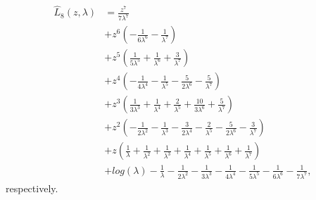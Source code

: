 \begin{displaymath}
\begin{split}
\hat{L}_{8}{\left (z,\lambda \right )} &= \frac{z^{7}}{7 \lambda^{7}} \\
&+ z^{6} \left(- \frac{1}{6 \lambda^{6}} - \frac{1}{\lambda^{7}}\right) \\
&+ z^{5} \left(\frac{1}{5 \lambda^{5}} + \frac{1}{\lambda^{6}} + \frac{3}{\lambda^{7}}\right) \\
&+ z^{4} \left(- \frac{1}{4 \lambda^{4}} - \frac{1}{\lambda^{5}} - \frac{5}{2 \lambda^{6}} - \frac{5}{\lambda^{7}}\right) \\
&+ z^{3} \left(\frac{1}{3 \lambda^{3}} + \frac{1}{\lambda^{4}} + \frac{2}{\lambda^{5}} + \frac{10}{3 \lambda^{6}} + \frac{5}{\lambda^{7}}\right) \\
&+ z^{2} \left(- \frac{1}{2 \lambda^{2}} - \frac{1}{\lambda^{3}} - \frac{3}{2 \lambda^{4}} - \frac{2}{\lambda^{5}} - \frac{5}{2 \lambda^{6}} - \frac{3}{\lambda^{7}}\right) \\
&+ z \left(\frac{1}{\lambda} + \frac{1}{\lambda^{2}} + \frac{1}{\lambda^{3}} + \frac{1}{\lambda^{4}} + \frac{1}{\lambda^{5}} + \frac{1}{\lambda^{6}} + \frac{1}{\lambda^{7}}\right) \\
&+ log{\left (\lambda \right )} - \frac{1}{\lambda} - \frac{1}{2 \lambda^{2}} - \frac{1}{3 \lambda^{3}} - \frac{1}{4 \lambda^{4}} - \frac{1}{5 \lambda^{5}} - \frac{1}{6 \lambda^{6}} - \frac{1}{7 \lambda^{7}},
\end{split}
\end{displaymath}
respectively.
    
    \iffalse
    Finally, an aspect that could be of interest concerns
    examination of functions that, once applied to Riordan arrays, produce
    matrices that are themselves Riordan arrays; the Pascal triangle is an
    instance for the $r$-th power function, namely $\mathcal{P}_{m}^{r}$ is a
    Riordan array, where $r\in\mathbb{Q}$. To this purpose, we might approach
    the problem from an analytic point of view in terms of functions $d(t)$ and
    $h(t)$ defining the Riordan array under investigation; this is the topic of
    a forthcoming paper.
    \fi

